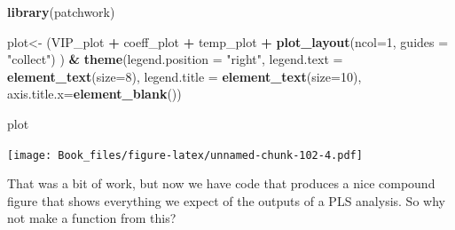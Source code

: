 \documentclass[
]{book}
\newenvironment{Shaded}{\begin{snugshade}}{\end{snugshade}}
\newcommand{\DataTypeTok}[1]{\textcolor[rgb]{0.13,0.29,0.53}{#1}}
\newcommand{\DecValTok}[1]{\textcolor[rgb]{0.00,0.00,0.81}{#1}}
\newcommand{\KeywordTok}[1]{\textcolor[rgb]{0.13,0.29,0.53}{\textbf{#1}}}
\newcommand{\NormalTok}[1]{#1}
\newcommand{\OperatorTok}[1]{\textcolor[rgb]{0.81,0.36,0.00}{\textbf{#1}}}
\newcommand{\StringTok}[1]{\textcolor[rgb]{0.31,0.60,0.02}{#1}}
\begin{document}
\begin{Shaded}
\begin{Highlighting}[]
\KeywordTok{library}\NormalTok{(patchwork)}

\NormalTok{plot<-}\StringTok{ }\NormalTok{(VIP_plot }\OperatorTok{+}
\StringTok{          }\NormalTok{coeff_plot }\OperatorTok{+}
\StringTok{          }\NormalTok{temp_plot }\OperatorTok{+}
\StringTok{          }\KeywordTok{plot_layout}\NormalTok{(}\DataTypeTok{ncol=}\DecValTok{1}\NormalTok{,}
            \DataTypeTok{guides =} \StringTok{"collect"}\NormalTok{)}
\NormalTok{        ) }\OperatorTok{&}\StringTok{ }\KeywordTok{theme}\NormalTok{(}\DataTypeTok{legend.position =} \StringTok{"right"}\NormalTok{,}
                  \DataTypeTok{legend.text =} \KeywordTok{element_text}\NormalTok{(}\DataTypeTok{size=}\DecValTok{8}\NormalTok{),}
                  \DataTypeTok{legend.title =} \KeywordTok{element_text}\NormalTok{(}\DataTypeTok{size=}\DecValTok{10}\NormalTok{),}
                  \DataTypeTok{axis.title.x=}\KeywordTok{element_blank}\NormalTok{())}

\NormalTok{plot}
\end{Highlighting}
\end{Shaded}

\texttt{[image: Book\_files/figure-latex/unnamed-chunk-102-4.pdf]}

That was a bit of work, but now we have code that produces a nice compound figure that shows everything we expect of the outputs of a PLS analysis. So why not make a function from this?
\end{document}
